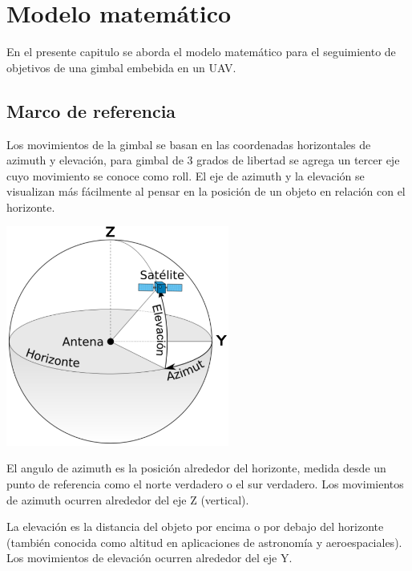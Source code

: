\chapter{Modelo matemático}

En el presente capitulo se aborda el modelo matemático para el seguimiento de objetivos de una gimbal embebida en un UAV.

\section{Marco de referencia}
Los movimientos de la gimbal se basan en las coordenadas horizontales de azimuth y elevación, para gimbal de 3 grados de libertad
se agrega un tercer eje cuyo movimiento se conoce como roll. El eje de azimuth y la elevación se visualizan más fácilmente al 
pensar en la posición de un objeto en relación con el horizonte.
\begin{center}
	\includegraphics[width=0.55\textwidth]{Contenido/Cuerpo/Capitulo3/Fig1.eps}
	\label{fig:ModeloMat:Fig1}
\end{center}
El angulo de azimuth es la posición alrededor del horizonte, medida desde un punto de referencia como el norte verdadero o el sur 
verdadero. Los movimientos de azimuth ocurren alrededor del eje Z (vertical).

La elevación es la distancia del objeto por encima o por debajo del horizonte (también conocida como altitud en aplicaciones de 
astronomía y aeroespaciales). Los movimientos de elevación ocurren alrededor del eje Y.

